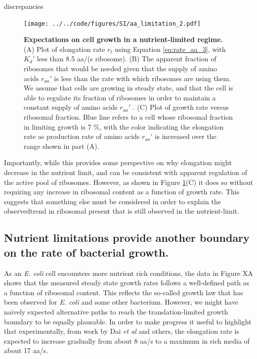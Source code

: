 discrepancies \documentclass[11pt, letterpaper]{article}
\begin{document}
\begin{figure}[H]
		\centering
    \texttt{[image: ../../code/figures/SI/aa\_limitation\_2.pdf]}
  \caption{{\bf Expectations on cell growth in a nutrient-limited regime.}
	(A) Plot of elongation rate $r_t$ using Equation \ref{eq:rate_aa_3}, with  $K_d'$
	less than 8.5 aa/(s ribosome). (B) The apparent fraction of ribosomes that would be needed
	given that the supply of amino acids $r_{aa}'$ is less than the rate with which
	ribosomes are using them. We assume that cells are growing in steady state, and that the cell is
	able to regulate its fraction of ribosomes in order to maintain a constant supply of amino acids $r_{aa}'$ . (C) Plot of growth rate versus ribosomal fraction. Blue line
	refers to a cell whose ribosomal fraction in limiting growth is 7 \%, with the color indicating
	the elongation rate as production rate of amino acids $r_{aa}'$ is increased over the range shown
	in part (A).  }
  \label{fig:aa_limitation_2}
\end{figure}

Importantly, while this provides some perspective on why elongation might decrease in the nutrient limit,
and can be consistent with apparent regulation of the active pool of ribosomes. However, as shown in
Figure \ref{fig:aa_limitation_2}(C) it does so
without requiring any increase in ribosomal
content as a function of growth rate. This suggests that something else must be considered in order to
explain the observedtrend in ribosomal present that is still observed in the nutrient-limit.



\newpage

\subsection{Nutrient limitations provide another boundary on the rate of
bacterial growth.}

As an {\it E. coli} cell encounters more nutrient rich conditions, the data in
Figure XA shows that the measured steady state growth rates follows a
well-defined path as a function of ribosomal content. This reflects the
so-called growth law that has been observed for {\it E. coli} and some other
bacterium. However, we might have naively expected alternative paths to reach
the translation-limited growth  boundary  to be equally plausable. In order to
make progress it useful to highlight that experimentally, from work by Dai {\it
et al} and others, the elongation rate is expected to increase gradually
from about 8 aa/s to a maximum in rich media of about 17 aa/s.
\end{document}
